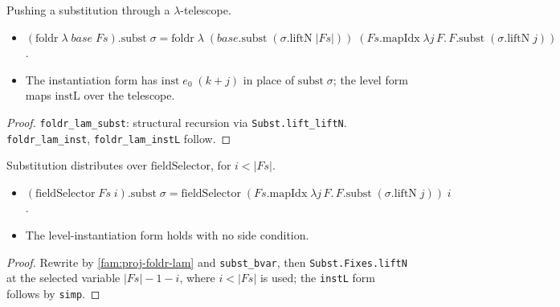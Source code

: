 \begin{lemma}
  \label{fam:proj-foldr-lam}
  \leanok

   Pushing a substitution through a $\lambda$-telescope.
  \begin{itemize}
  \item $(\mathrm{foldr}\;\lambda\;base\;Fs).\mathrm{subst}\;\sigma = \mathrm{foldr}\;\lambda\;
        (base.\mathrm{subst}\;(\sigma.\mathrm{liftN}\;|Fs|))\;(Fs.\mathrm{mapIdx}\;\lambda j\,F.\,
        F.\mathrm{subst}\;(\sigma.\mathrm{liftN}\;j))$.
  \item The instantiation form has $\mathrm{inst}\;e_0\;(k+j)$ in place of $\mathrm{subst}\;\sigma$;
        the level form maps $\mathrm{instL}$ over the telescope.
  \end{itemize}
\end{lemma}
\begin{proof}
  \leanok
   \texttt{foldr\_lam\_subst}: structural recursion via \texttt{Subst.lift\_liftN}.
  \texttt{foldr\_lam\_inst}, \texttt{foldr\_lam\_instL} follow.
\end{proof}

\begin{lemma}
  \label{fam:proj-fieldselector-subst}
  \leanok

   Substitution distributes over $\mathrm{fieldSelector}$, for $i<|Fs|$.
  \begin{itemize}
  \item $(\mathrm{fieldSelector}\;Fs\;i).\mathrm{subst}\;\sigma =
        \mathrm{fieldSelector}\;(Fs.\mathrm{mapIdx}\;\lambda j\,F.\,F.\mathrm{subst}\;
        (\sigma.\mathrm{liftN}\;j))\;i$.
  \item The level-instantiation form holds with no side condition.
  \end{itemize}
\end{lemma}
\begin{proof}
  \leanok
   Rewrite by \ref{fam:proj-foldr-lam} and \texttt{subst\_bvar}, then
  \texttt{Subst.Fixes.liftN} at the selected variable $|Fs|-1-i$, where $i<|Fs|$ is used; the
  \texttt{instL} form follows by \texttt{simp}.
\end{proof}


